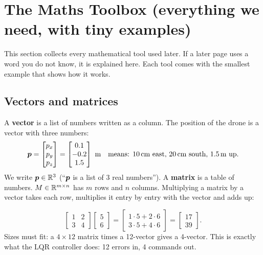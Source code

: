 \section{The Maths Toolbox (everything we need, with tiny examples)}
\label{sec:maths}

This section collects every mathematical tool used later. If a later page uses a word you do not know, it is
explained here. Each tool comes with the smallest example that shows how it works.

\subsection{Vectors and matrices}

A \textbf{vector} is a list of numbers written as a column. The position of the drone is a vector with three numbers:
\[
\vp=\begin{bmatrix}p_x\\p_y\\p_z\end{bmatrix}=\begin{bmatrix}0.1\\-0.2\\1.5\end{bmatrix}\ \text{m}
\quad\text{means: 10\,cm east, 20\,cm south, 1.5\,m up.}
\]
We write $\bm{p}\in\mathbb{R}^3$ (``$\bm{p}$ is a list of 3 real numbers''). A \textbf{matrix} is a table of numbers. $M\in\mathbb{R}^{m\times n}$ has
$m$ rows and $n$ columns. Multiplying a matrix by a vector takes each row, multiplies it entry by entry with the vector
and adds up:
\begin{toy}
\[
\begin{bmatrix}1&2\\3&4\end{bmatrix}\begin{bmatrix}5\\6\end{bmatrix}=\begin{bmatrix}1\cdot5+2\cdot6\\3\cdot5+4\cdot6\end{bmatrix}=\begin{bmatrix}17\\39\end{bmatrix}.
\]
Sizes must fit: a $4\times12$ matrix times a 12-vector gives a 4-vector. This is exactly what the LQR controller does:
12 errors in, 4 commands out.
\end{toy}

